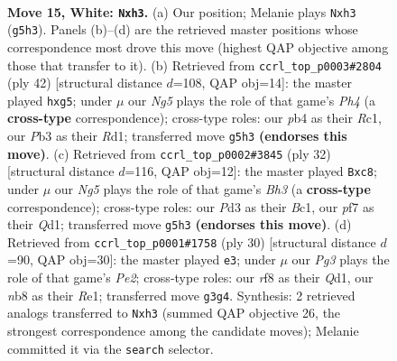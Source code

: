 \documentclass[11pt]{article}
\begin{document}
\begin{figure}[p]\centering
\begin{subfigure}{0.46\textwidth}\centering
\resizebox{\linewidth}{!}{%
\newchessgame
\chessboard[
  setfen={rn1q1rk1/4bp2/5np1/p1p1p1Np/1p1p3P/1P1P2Pb/P1P1PP2/RNB1QRK1 w - - 0 15},
  showmover=false,
  pgfstyle=straightmove, color=movearrow, markmove={g5-h3}
]}
\caption{}
\end{subfigure}\hfill
\begin{subfigure}{0.46\textwidth}\centering
\resizebox{\linewidth}{!}{%
\newchessgame
\chessboard[
  setfen={4qrk1/r1pbbn1p/1p1pp3/p4pp1/2PP3P/PPBNP1P1/2Q2PB1/2RR2K1 w - - 0 22},
  showmover=false,
  pgfstyle=straightmove, color=movearrow, markmove={h4-g5}
]}
\caption{}
\end{subfigure}
\\[4pt]
\begin{subfigure}{0.46\textwidth}\centering
\resizebox{\linewidth}{!}{%
\newchessgame
\chessboard[
  setfen={r1bqr1k1/p3bp1p/1p1p1np1/2pPp3/P1P1P2P/2P3PB/R4P1N/2BQR1K1 w - - 2 17},
  showmover=false,
  pgfstyle=straightmove, color=movearrow, markmove={h3-c8}
]}
\caption{}
\end{subfigure}\hfill
\begin{subfigure}{0.46\textwidth}\centering
\resizebox{\linewidth}{!}{%
\newchessgame
\chessboard[
  setfen={2rq1r2/5pbk/p1npbnpp/1ppNp3/2P4P/PP1P2P1/3BPPBN/1R1QR1K1 w - - 0 16},
  showmover=false,
  pgfstyle=straightmove, color=movearrow, markmove={e2-e3}
]}
\caption{}
\end{subfigure}
\caption{\textbf{Move 15, White: \texttt{Nxh3}.} (a) Our position; Melanie plays \texttt{Nxh3} (\texttt{g5h3}). Panels (b)--(d) are the retrieved master positions whose correspondence most drove this move (highest QAP objective among those that transfer to it). (b) Retrieved from \texttt{ccrl\_top\_p0003\#2804} (ply 42) [structural distance $d$=108, QAP obj=14]: the master played \texttt{hxg5}; under $\mu$ our \emph{Ng5} plays the role of that game's \emph{Ph4} (a \textbf{cross-type} correspondence); cross-type roles: our \emph{p}b4 as their \emph{R}c1, our \emph{P}b3 as their \emph{R}d1; transferred move \texttt{g5h3} \textbf{(endorses this move)}. (c) Retrieved from \texttt{ccrl\_top\_p0002\#3845} (ply 32) [structural distance $d$=116, QAP obj=12]: the master played \texttt{Bxc8}; under $\mu$ our \emph{Ng5} plays the role of that game's \emph{Bh3} (a \textbf{cross-type} correspondence); cross-type roles: our \emph{P}d3 as their \emph{B}c1, our \emph{p}f7 as their \emph{Q}d1; transferred move \texttt{g5h3} \textbf{(endorses this move)}. (d) Retrieved from \texttt{ccrl\_top\_p0001\#1758} (ply 30) [structural distance $d$=90, QAP obj=30]: the master played \texttt{e3}; under $\mu$ our \emph{Pg3} plays the role of that game's \emph{Pe2}; cross-type roles: our \emph{r}f8 as their \emph{Q}d1, our \emph{n}b8 as their \emph{R}e1; transferred move \texttt{g3g4}. Synthesis: 2 retrieved analogs transferred to \texttt{Nxh3} (summed QAP objective 26, the strongest correspondence among the candidate moves); Melanie committed it via the \texttt{search} selector.}
\label{fig:thought-m28}
\end{figure}
\end{document}
